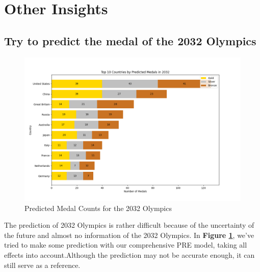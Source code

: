 \section{Other Insights}

\subsection{Try to predict the medal of the 2032 Olympics}

\begin{figure}[h]
\centering
\includegraphics[width=1\textwidth]{../figures/2032.png}
\caption{Predicted Medal Counts for the 2032 Olympics}
\label{fig:medal_prediction}
\end{figure}

The prediction of 2032 Olympics is rather difficult because of the uncertainty of the future and almost no information of the 2032 Olympics. In \textbf{Figure \ref{fig:medal_prediction}}, we've tried to make some prediction with our comprehensive PRE model, taking all effects into account.Although the prediction may not be accurate enough, it can still serve as a reference.

